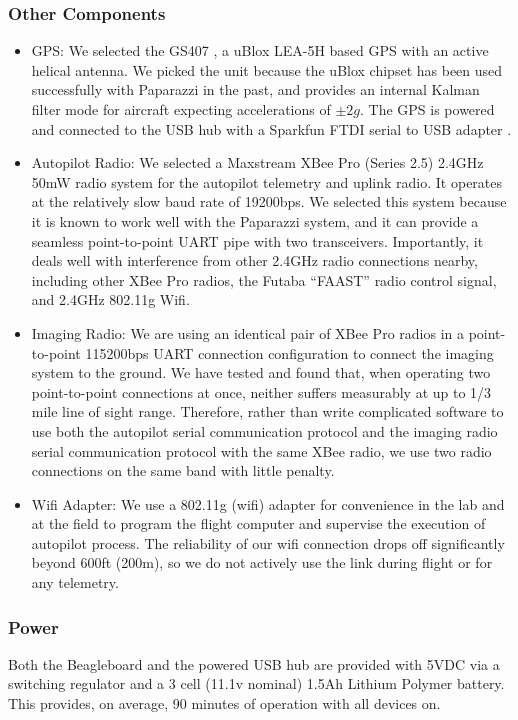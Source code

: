 \documentclass[pdftex,10pt,letter]{article}
\begin{document}
\subsubsection{Other Components}
\begin{itemize}
	\setlength{\itemsep}{0cm}
	\setlength{\parskip}{0cm}
	\item GPS: We selected the GS407 \cite{gs407gps}, a uBlox LEA-5H \cite{ublox_lea5h} based GPS with an active helical antenna. We picked the unit because the uBlox chipset has been used successfully with Paparazzi in the past, and provides an internal Kalman filter mode for aircraft expecting accelerations of $\pm2g$. The GPS is powered and connected to the USB hub with a Sparkfun FTDI serial to USB adapter \cite{sparkfun_ftdi}. 
	\item Autopilot Radio: We selected a Maxstream XBee Pro (Series 2.5) 2.4GHz 50mW \cite{xbeepro24} radio system for the autopilot telemetry and uplink radio. It operates at the relatively slow baud rate of 19200bps. We selected this system because it is known to work well with the Paparazzi system, and it can provide a seamless point-to-point UART pipe with two transceivers. Importantly, it deals well with interference from other 2.4GHz radio connections nearby, including other XBee Pro radios, the Futaba ``FAAST'' radio control signal, and 2.4GHz 802.11g Wifi.
	\item Imaging Radio: We are using an identical pair of XBee Pro radios in a point-to-point 115200bps UART connection configuration to connect the imaging system to the ground. We have tested and found that, when operating two point-to-point connections at once, neither suffers measurably at up to 1/3 mile line of sight range. Therefore, rather than write complicated software to use both the autopilot serial communication protocol and the imaging radio serial communication protocol with the same XBee radio, we use two radio connections on the same band with little penalty. 
	\item Wifi Adapter: We use a 802.11g (wifi) adapter for convenience in the lab and at the field to program the flight computer and supervise the execution of autopilot process. The reliability of our wifi connection drops off significantly beyond 600ft (200m), so we do not actively use the link during flight or for any telemetry.
\end{itemize}
\subsubsection{Power}
Both the Beagleboard and the powered USB hub are provided with 5VDC via a switching regulator and a 3 cell (11.1v nominal) 1.5Ah Lithium Polymer battery. This provides, on average, 90 minutes of operation with all devices on.
\end{document}
